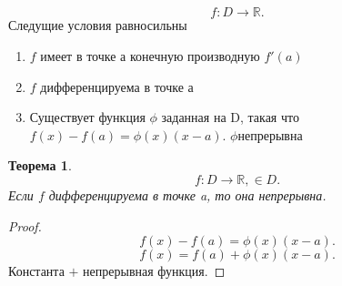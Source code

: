 \documentclass[a4paper]{scrartcl}
\newtheorem{theorem}{Теорема}
\begin{document}
\subsection{}
\[
	f : D \to \mathbb{R}
	.\]
Следущие условия равносильны
\begin{enumerate}
	\item $f$ имеет в точке а конечную производную  $f'(a)$
	\item  $f$ дифференцируема в точке а
	\item Существует функция  $\phi$ заданная на D, такая что  $f(x) - f(a) = \phi(x)(x - a)$.  $\phi$непрерывна
\end{enumerate}
\begin{theorem}
	\[
		f: D \to \mathbb{R},  \in D
		.\]
	Если $f$ дифференцируема в точке a, то она непрерывна.
\end{theorem}
\begin{proof}
	\[
		f(x) - f(a) = \phi(x)(x-a)
		.\]
	\[
		f(x) = f(a) + \phi(x)(x - a)
		.\]
	Константа $+$ непрерывная функция.
\end{proof}
\end{document}
